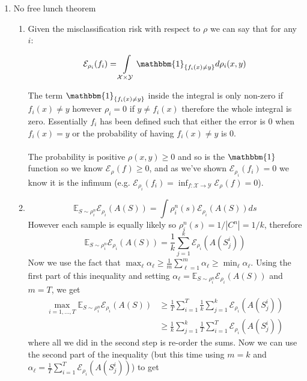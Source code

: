 \documentclass{article}
\newcommand{\one}{\mathbbm{1}}
\newcommand{\ones}[2]{\one_{\{#1\ne#2\}}}
\newcommand{\err}[2]{\mathcal{E}_{\rho_{#1}}(#2_{#1})}
\newcommand{\prob}[2]{\rho_#1^#2}
\newcommand{\expectation}{\mathbb{E}_{S\sim\prob{i}{n}}}
\begin{document}
\begin{enumerate}
    \item No free lunch theorem
    \begin{enumerate}[label=\alph*.]
    \item Given the misclassification risk with respect to $\rho$ we can say that for any $i$:

    \begin{equation*}
        \err{i}{f} = \int\limits_{\mathcal{X}\times\mathcal{Y}}\ones{f_i(x)}{y}d\rho_{i}(x,y)
    \end{equation*}

    The term $\ones{f_i(x)}{y}$ inside the integral is only non-zero if $f_i(x)\ne y$ however $\rho_i = 0$ if $y\ne f_i(x)$ therefore the whole integral is zero. Essentially $f_i$ has been defined such that either the error is 0 when $f_i(x) = y$ or the probability of having $f_i(x) \ne y$ is 0.
    \\\\
    The probability is positive $\rho(x,y)\ge 0$ and so is the $\one$ function so we know $\err{{}}{f} \ge 0$, and as we've shown $\err{i}{f} = 0$ we know it is the infimum (e.g. $\err{i}{f} = \inf_{f:\mathcal{X}\rightarrow\mathcal{Y}}\err{}{f}=0$).
    \item
    \begin{equation*}
        \expectation\mathcal{E}_{\rho_i}(A(S)) = \int\prob{i}{n}(s)\mathcal{E}_{\rho_i}(A(S))ds
    \end{equation*}
    However each sample is equally likely so $\rho^n_i(s) = 1/{|C^n|} = 1/k$, therefore
    \begin{equation*}
        \expectation\mathcal{E}_{\rho_i}(A(S)) = \frac{1}{k}\sum\limits_{j=1}^{k}\mathcal{E}_{\rho_i}(A(S_j^i))
    \end{equation*}
    Now we use the fact that $\max _{\ell} \alpha_{\ell} \geq \frac{1}{m} \sum_{\ell=1}^m\alpha_{\ell} \geq \min _{\ell} \alpha_{\ell}$. Using the first part of this inequality and setting $\alpha_{\ell} = \expectation\mathcal{E}_{\rho_i}(A(S))$ and $m=T$, we get
    \begin{align*}
        \max_{i=1,\dots,T}\expectation\mathcal{E}_{\rho_i}(A(S)) &\ge \frac{1}{T}\sum\limits_{i=1}^{T}\frac{1}{k}\sum\limits_{j=1}^{k}\mathcal{E}_{\rho_i}(A(S_j^i)) \\
        &\ge \frac{1}{k}\sum\limits_{j=1}^{k}\frac{1}{T}\sum\limits_{i=1}^{T}\mathcal{E}_{\rho_i}(A(S_j^i))
    \end{align*}
    where all we did in the second step is re-order the sums. Now we can use the second part of the inequality (but this time using $m=k$ and $\alpha_{\ell} = \frac{1}{T}\sum\limits_{i=1}^{T}\mathcal{E}_{\rho_i}(A(S_j^i))$) to get

\end{enumerate}
\end{enumerate}
\end{document}
